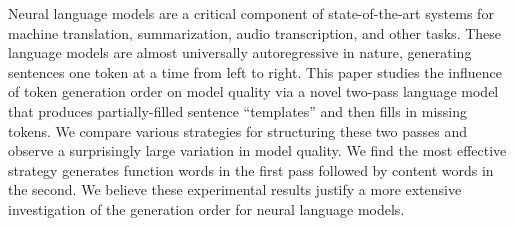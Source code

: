 Neural language models are a critical component of state-of-the-art systems for machine translation, summarization, audio transcription, and other tasks. These language models are almost universally autoregressive in nature, generating sentences one token at a time from left to right. This paper studies the influence of token generation order on model quality via a novel two-pass language model that produces partially-filled sentence ``templates'' and then fills  in missing tokens. We compare various strategies for structuring these two passes and observe a surprisingly large variation in model quality. We find the most  effective strategy generates function words in the first pass followed by content words in the second. We believe these experimental results justify a more extensive investigation of the generation order for neural language models.
